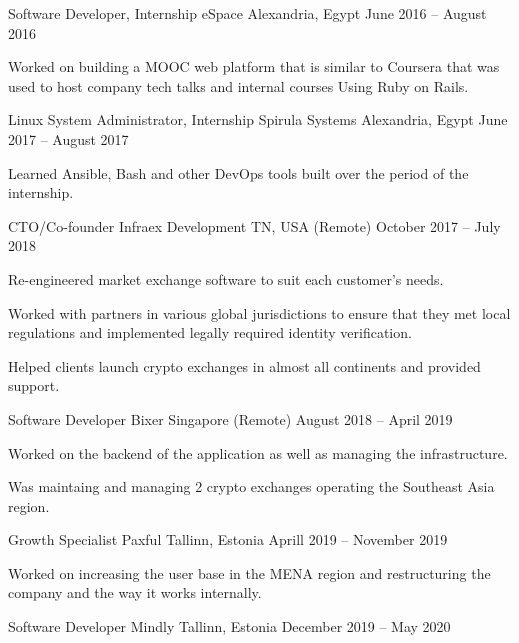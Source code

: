\documentclass[]{awesome-cv}
\begin{document}
\vspace{-8mm}
\begin{cventries}
	\cventry
	{Software Developer, Internship}
	{eSpace}
	{Alexandria, Egypt}
	{June 2016 – August 2016}
	{\begin{cvitems}
		\item {Worked on building a MOOC web platform that is similar to Coursera that was used to host company tech talks and internal courses Using Ruby on Rails.}
		\end{cvitems}}
	\cventry
	{Linux System Administrator, Internship}
	{Spirula Systems}
	{Alexandria, Egypt}
	{June 2017 – August 2017}
	{\begin{cvitems}
		\item {Learned Ansible, Bash and other DevOps tools built over the period of the internship.}
		\end{cvitems}}
	\cventry
	{CTO/Co-founder}
	{Infraex Development}
	{TN, USA (Remote)}
	{October 2017 – July 2018}
	{\begin{cvitems}
		\item {Re-engineered market exchange software to suit each customer’s needs.}
		\item {Worked with partners in various global jurisdictions to ensure that they met local regulations and implemented legally required identity verification.}
		\item {Helped clients launch crypto exchanges in almost all continents and provided support.}
		\end{cvitems}}
	\cventry
	{Software Developer}
	{Bixer}
	{Singapore (Remote)}
	{August 2018 – April 2019}
	{\begin{cvitems}
		\item {Worked on the backend of the application as well as managing the infrastructure.}
		\item {Was maintaing and managing 2 crypto exchanges operating the Southeast Asia region.}
		\end{cvitems}}
	\cventry
	{Growth Specialist}
	{Paxful}
	{Tallinn, Estonia}
	{Aprill 2019 – November 2019}
	{\begin{cvitems}
		\item {Worked on increasing the user base in the MENA region and restructuring the company and the way it works internally.}
		\end{cvitems}}
	\cventry
	{Software Developer}
	{Mindly}
	{Tallinn, Estonia}
	{December 2019 – May 2020}

\end{cventries}
\end{document}

